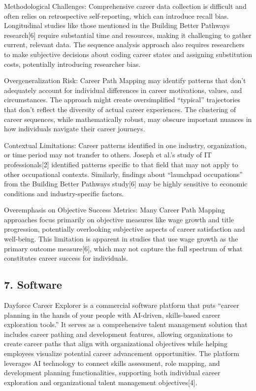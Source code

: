 \documentclass[
  letterpaper,
  DIV=11,
  numbers=noendperiod]{scrartcl}
\begin{document}
Methodological Challenges: Comprehensive career data collection is
difficult and often relies on retrospective self-reporting, which can
introduce recall bias. Longitudinal studies like those mentioned in the
Building Better Pathways research{[}6{]} require substantial time and
resources, making it challenging to gather current, relevant data. The
sequence analysis approach also requires researchers to make subjective
decisions about coding career states and assigning substitution costs,
potentially introducing researcher bias.

Overgeneralization Risk: Career Path Mapping may identify patterns that
don't adequately account for individual differences in career
motivations, values, and circumstances. The approach might create
oversimplified ``typical'' trajectories that don't reflect the diversity
of actual career experiences. The clustering of career sequences, while
mathematically robust, may obscure important nuances in how individuals
navigate their career journeys.

Contextual Limitations: Career patterns identified in one industry,
organization, or time period may not transfer to others. Joseph et al.'s
study of IT professionals{[}2{]} identified patterns specific to that
field that may not apply to other occupational contexts. Similarly,
findings about ``launchpad occupations'' from the Building Better
Pathways study{[}6{]} may be highly sensitive to economic conditions and
industry-specific factors.

Overemphasis on Objective Success Metrics: Many Career Path Mapping
approaches focus primarily on objective measures like wage growth and
title progression, potentially overlooking subjective aspects of career
satisfaction and well-being. This limitation is apparent in studies that
use wage growth as the primary outcome measure{[}6{]}, which may not
capture the full spectrum of what constitutes career success for
individuals.

\subsection{7. Software}\label{software}

Dayforce Career Explorer is a commercial software platform that puts
``career planning in the hands of your people with AI-driven,
skills-based career exploration tools.'' It serves as a comprehensive
talent management solution that includes career pathing and development
features, allowing organizations to create career paths that align with
organizational objectives while helping employees visualize potential
career advancement opportunities. The platform leverages AI technology
to connect skills assessment, role mapping, and development planning
functionalities, supporting both individual career exploration and
organizational talent management objectives{[}4{]}.
\end{document}
